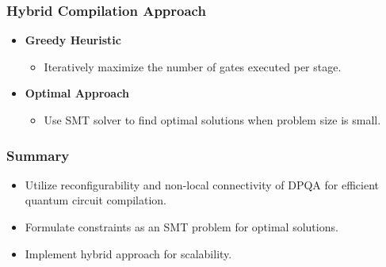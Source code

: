 \documentclass[18 pt]{beamer}
\begin{document}
\begin{frame}
    \frametitle{Hybrid Compilation Approach}
    \begin{itemize}
        \item \textbf{Greedy Heuristic}
        \begin{itemize}
            \item Iteratively maximize the number of gates executed per stage.
        \end{itemize}
        \item \textbf{Optimal Approach}
        \begin{itemize}
            \item Use SMT solver to find optimal solutions when problem size is small.
        \end{itemize}
    \end{itemize}
\end{frame}

\begin{frame}
    \frametitle{Summary}
    \begin{itemize}
        \item Utilize reconfigurability and non-local connectivity of DPQA for efficient quantum circuit compilation.
        \item Formulate constraints as an SMT problem for optimal solutions.
        \item Implement hybrid approach for scalability.
    \end{itemize}
\end{frame}

\end{document}
